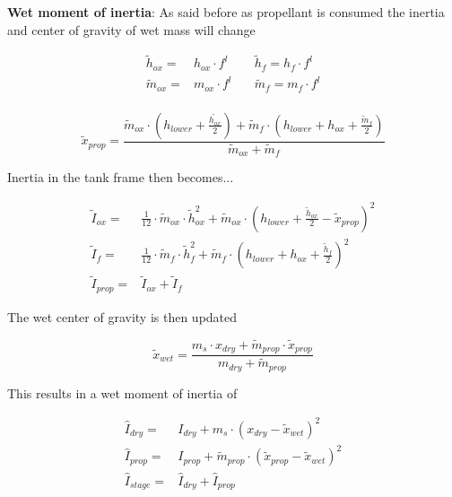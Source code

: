 \textbf{Wet moment of inertia}: As said before as propellant is consumed the inertia and center of gravity of wet mass will change

\begin{equation}
\begin{aligned}
    \tilde{h}_{ox} =& h_{ox} \cdot f^l \quad &\tilde{h}_f = h_f \cdot f^l \\
    \tilde{m}_{ox} =& m_{ox} \cdot f^l \quad &\tilde{m}_f = m_f \cdot f^l \\
\end{aligned}
\end{equation}

\begin{equation}
    \tilde{x}_{prop} = \frac{\tilde{m}_{ox} \cdot (h_{lower} + \frac{\tilde{h_{ox}}}{2}) + \tilde{m}_f \cdot (h_{lower} + h_{ox} + \frac{\tilde{m}_f}{2})}{\tilde{m}_{ox} + \tilde{m}_f}
\end{equation}

Inertia in the tank frame then becomes...

\begin{equation}
\begin{aligned}
    \tilde{I}_{ox} =& \frac{1}{12} \cdot \tilde{m}_{ox} \cdot \tilde{h}_{ox}^2 + \tilde{m}_{ox} \cdot (h_{lower} + \frac{\tilde{h}_{ox}}{2} - \tilde{x}_{prop})^2 \\
    \tilde{I}_{f} =& \frac{1}{12} \cdot \tilde{m}_f \cdot \tilde{h}_f^2 + \tilde{m}_f \cdot (h_{lower} + h_{ox} + \frac{\tilde{h}_f}{2})^2 \\
    \tilde{I}_{prop} =& \tilde{I}_{ox} + \tilde{I}_f
\end{aligned}
\end{equation}

The wet center of gravity is then updated

\begin{equation}
    \tilde{x}_{wet} = \frac{m_s \cdot x_{dry} + \tilde{m}_{prop} \cdot \tilde{x}_{prop}}{m_{dry} + \tilde{m}_{prop}}
\end{equation}

This results in a wet moment of inertia of

\begin{equation}
\begin{aligned}
    \hat{I}_{dry} =& I_{dry} + m_{s} \cdot (x_{dry} - \tilde{x}_{wet})^2 \\
    \hat{I}_{prop} =& I_{prop} + \tilde{m}_{prop} \cdot (\tilde{x}_{prop} - \tilde{x}_{wet})^2 \\
    \hat{I}_{stage} =& \hat{I}_{dry} + \hat{I}_{prop}
\end{aligned}
\end{equation}

